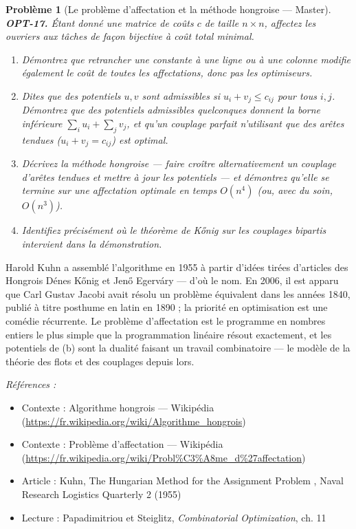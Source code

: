 \documentclass[11pt]{article}
\newtheorem{problem}{Problème}
\newenvironment{refs}{\par\small\noindent\emph{Références :}\begin{itemize}\setlength\itemsep{0pt}}{\end{itemize}\normalsize}
\begin{document}
\begin{problem}[{Le problème d'affectation et la méthode hongroise --- Master}]
\textbf{OPT-17.} Étant donné une matrice de coûts $c$ de taille $n \times n$, affectez les ouvriers aux tâches de façon bijective à coût total minimal.
\begin{enumerate}
\item[(a)] Démontrez que retrancher une constante à une ligne ou à une colonne modifie également le coût de toutes les affectations, donc pas les optimiseurs.
\item[(b)] Dites que des potentiels $u, v$ sont \textit{admissibles} si $u_i + v_j \le c_{ij}$ pour tous $i, j$. Démontrez que des potentiels admissibles quelconques donnent la borne inférieure $\sum_i u_i + \sum_j v_j$, et qu'un couplage parfait n'utilisant que des arêtes tendues ($u_i + v_j = c_{ij}$) est optimal.
\item[(c)] Décrivez la méthode hongroise --- faire croître alternativement un couplage d'arêtes tendues et mettre à jour les potentiels --- et démontrez qu'elle se termine sur une affectation optimale en temps $O(n^4)$ (ou, avec du soin, $O(n^3)$).
\item[(d)] Identifiez précisément où le théorème de K\H{o}nig sur les couplages bipartis intervient dans la démonstration.
\end{enumerate}

\end{problem}

\noindent Harold Kuhn a assemblé l'algorithme en 1955 à partir d'idées tirées d'articles des Hongrois Dénes K\H{o}nig et Jen\H{o} Egerváry --- d'où le nom. En 2006, il est apparu que Carl Gustav Jacobi avait résolu un problème équivalent dans les années 1840, publié à titre posthume en latin en 1890 ; la priorité en optimisation est une comédie récurrente. Le problème d'affectation est le programme en nombres entiers le plus simple que la programmation linéaire résout exactement, et les potentiels de (b) sont la dualité faisant un travail combinatoire --- le modèle de la théorie des flots et des couplages depuis lors.

\begin{refs}
\item Contexte : Algorithme hongrois --- Wikipédia (\url{https://fr.wikipedia.org/wiki/Algorithme_hongrois})
\item Contexte : Problème d'affectation --- Wikipédia (\url{https://fr.wikipedia.org/wiki/Probl%C3%A8me_d%27affectation})
\item Article : Kuhn, \og{} The Hungarian Method for the Assignment Problem \fg{}, Naval Research Logistics Quarterly 2 (1955)
\item Lecture : Papadimitriou et Steiglitz, \textit{Combinatorial Optimization}, ch. 11
\end{refs}
\end{document}
